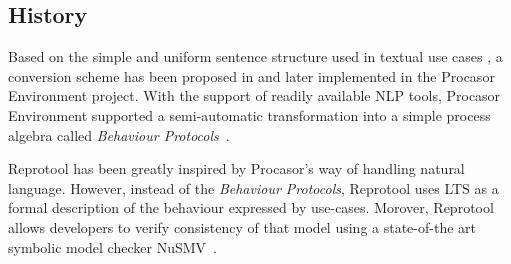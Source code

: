 \subsection{History}
Based on the simple and uniform sentence structure used in textual use cases \cite{Cockburn:2000:WEU:517669}, a conversion scheme has been proposed in \cite{MenclDeriving,MenclImprovedDeriving} and later implemented in the Procasor Environment project. With the support of readily available \ac{NLP} tools, Procasor Environment supported a semi-automatic transformation into a simple process algebra called \emph{Behaviour Protocols}~\cite{BehaviourProtocols}.

Reprotool has been greatly inspired by Procasor's way of handling natural language.
However, instead of the \emph{Behaviour Protocols}, Reprotool uses \ac{LTS} as a formal description of the behaviour expressed by use-cases. Morover, Reprotool allows developers to verify consistency of that model using a state-of-the art symbolic model checker NuSMV~\cite{NuSMV-CAV02}.